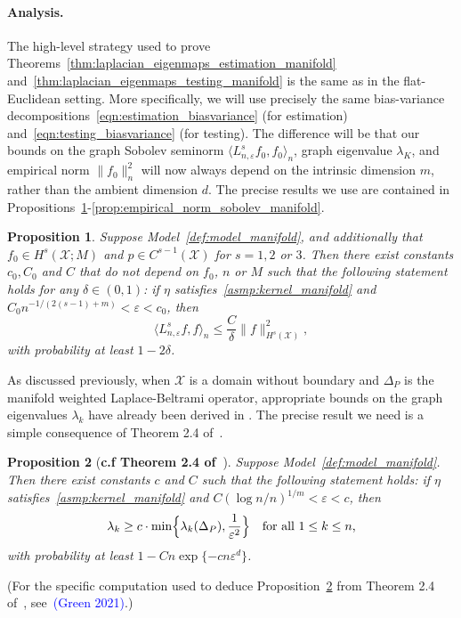 \documentclass{article}
\newcommand{\1}{\mathbf{1}}
\newcommand{\mc}[1]{\mathcal{#1}}
\newcommand{\dotp}[2]{\langle #1, #2 \rangle}
\theoremstyle{alden}
\theoremstyle{aldenthm}
\newtheorem{proposition}{Proposition}
\theoremstyle{definition}
\theoremstyle{remark}
\begin{document}

\paragraph{Analysis.}
The high-level strategy used to prove Theorems~\ref{thm:laplacian_eigenmaps_estimation_manifold} and~\ref{thm:laplacian_eigenmaps_testing_manifold} is the same as in the flat-Euclidean setting. More specifically, we will use precisely the same bias-variance decompositions~\eqref{eqn:estimation_biasvariance} (for estimation) and~\eqref{eqn:testing_biasvariance} (for testing). The difference will be that our bounds on the graph Sobolev seminorm $\dotp{L_{n,\varepsilon}^sf_0}{f_0}_n$, graph eigenvalue $\lambda_K$, and empirical norm $\|f_0\|_n^2$ will now always depend on the intrinsic dimension $m$, rather than the ambient dimension $d$. The precise results we use are contained in Propositions~\ref{prop:graph_seminorm_manifold}-\ref{prop:empirical_norm_sobolev_manifold}.
\begin{proposition}
	\label{prop:graph_seminorm_manifold} 
	Suppose Model~\ref{def:model_manifold}, and additionally that $f_0 \in H^s(\mc{X};M)$ and $p \in C^{s - 1}(\mc{X})$ for $s = 1,2$ or $3$. Then there exist constants $c_0,C_0$ and $C$ that do not depend on $f_0$, $n$ or $M$ such that the following statement holds for any $\delta \in (0,1)$: if $\eta$ satisfies~\ref{asmp:kernel_manifold} and $C_0n^{-1/(2(s - 1) + m)} < \varepsilon < c_0$, then
	\begin{equation}
	\label{eqn:graph_seminorm_manifold}
	\dotp{L_{n,\varepsilon}^s f}{f}_n \leq \frac{C}{\delta} \|f\|_{H^s(\mc{X})}^2,
	\end{equation}
	with probability at least $1 - 2\delta$.
\end{proposition}

As discussed previously, when $\mc{X}$ is a domain without boundary and $\Delta_P$ is the manifold weighted Laplace-Beltrami operator, appropriate bounds on the graph eigenvalues $\lambda_k$ have already been derived in \citep{burago2014,trillos2019,garciatrillos19}. The precise result we need is a simple consequence of Theorem 2.4 of~\citep{calder2019}.
\begin{proposition}[\textbf{c.f Theorem 2.4 of~\citep{calder2019}}]
	\label{prop:graph_eigenvalue_manifold}
	Suppose Model~\ref{def:model_manifold}. Then there exist constants $c$ and $C$ such that the following statement holds: if $\eta$ satisfies~\ref{asmp:kernel_manifold} and $C(\log n/n)^{1/m} < \varepsilon < c$, then
	\begin{equation}
	\label{eqn:graph_eigenvalue_manifold}
	\lambda_k \geq c \cdot \min\Bigl\{\lambda_k(\Delta_P), \frac{1}{\varepsilon^{2}} \Bigr\} \quad \textrm{for all $1 \leq k \leq n$,}
	\end{equation}
	with probability at least $1 - Cn\exp\{-c n\varepsilon^d\}$. 
\end{proposition}
(For the specific computation used to deduce Proposition~\ref{prop:graph_eigenvalue_manifold} from Theorem 2.4 of~\citep{calder2019}, see~\textcolor{blue}{(Green 2021)}.)
\end{document}
